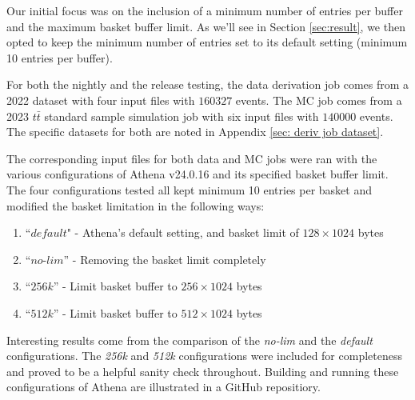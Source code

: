 Our initial focus was on the inclusion of a minimum number of entries per buffer and the maximum basket buffer limit. 
As we'll see in Section \ref{sec:result}, we then opted to keep the minimum number of entries set to its default setting (minimum 10 entries per buffer).

For both the nightly and the release testing, the data derivation job comes from a 2022 dataset with four input files with $160327$ events. 
The MC job comes from a 2023 $t\bar{t}$ standard sample simulation job with six input files with $140000$ events. 
The specific datasets for both are noted in Appendix \ref{sec: deriv job dataset}.


The corresponding input files for both data and MC jobs were ran with the various configurations of Athena v24.0.16 and its specified basket buffer limit.
The four configurations tested all kept minimum 10 entries per basket and modified the basket limitation in the following ways: 

\begin{enumerate}
    \item ``$\textit{default}$" - Athena's default setting, and basket limit of $128\times1024$ bytes
    \item ``$\textit{no-lim}$'' - Removing the basket limit completely
    \item ``$\textit{256k}$'' - Limit basket buffer to $256\times1024$ bytes
    \item ``$\textit{512k}$'' - Limit basket buffer to $512\times1024$ bytes
\end{enumerate}

Interesting results come from the comparison of the \textit{no-lim} and the \textit{default} configurations. 
The \textit{256k} and \textit{512k} configurations were included for completeness and proved to be a helpful sanity check throughout. 
Building and running these configurations of Athena are illustrated in a GitHub repositiory. \cite{Kraus}
